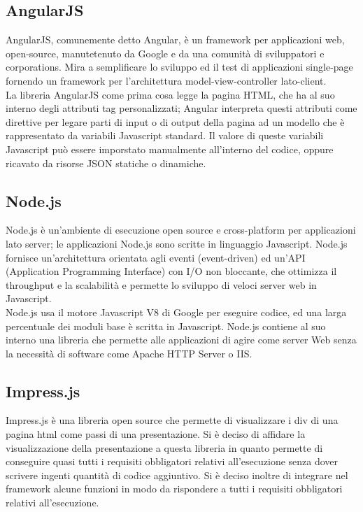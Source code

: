	\subsection{AngularJS}{
		AngularJS, comunemente detto Angular, è un framework per applicazioni web, open-source, manutetenuto da Google e da una comunità di sviluppatori e corporations. Mira a semplificare lo sviluppo ed il test di applicazioni single-page fornendo un framework per l'architettura model-view-controller lato-client. \\
		La libreria AngularJS come prima cosa legge la pagina HTML, che ha al suo interno degli attributi tag personalizzati; Angular interpreta questi attributi come direttive per legare parti di input o di output della pagina ad un modello che è rappresentato da variabili Javascript standard. Il valore di queste variabili Javascript può essere imporstato manualmente all'interno del codice, oppure ricavato da risorse JSON statiche o dinamiche.
	}
	\subsection{Node.js}{
		Node.js è un'ambiente di esecuzione open source e cross-platform per applicazioni lato server; le applicazioni Node.js sono scritte in linguaggio Javascript. Node.js fornisce un'architettura orientata agli eventi (event-driven) ed un'API (Application Programming Interface) con I/O non bloccante, che ottimizza il throughput e la scalabilità e permette lo sviluppo di veloci server web in Javascript. \\
		Node.js usa il motore Javascript V8 di Google per eseguire codice, ed una larga percentuale dei moduli base è scritta in Javascript. Node.js contiene al suo interno una libreria che permette alle applicazioni di agire come server Web senza la necessità di software come Apache HTTP Server o IIS.
	}
	\subsection{Impress.js}{
		Impress.js è una libreria open source che permette di visualizzare i div di una pagina html come passi di una presentazione. Si è deciso di affidare la visualizzazione della presentazione a questa libreria in quanto permette di conseguire quasi tutti i requisiti obbligatori relativi all’esecuzione senza dover scrivere ingenti quantità di codice aggiuntivo.
		Si è deciso inoltre di integrare nel framework alcune funzioni in modo da rispondere a tutti i requisiti obbligatori relativi all’esecuzione.
	}